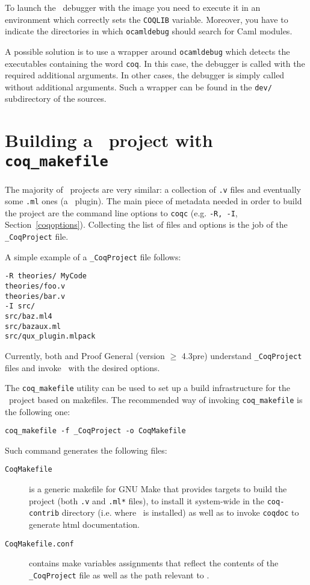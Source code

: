 To launch the \ocaml\ debugger with the image you need to execute it in
an environment which correctly sets the \texttt{COQLIB} variable.
Moreover, you have to indicate the directories in which
\texttt{ocamldebug} should search for Caml modules.

A possible solution is to use a wrapper around \texttt{ocamldebug}
which detects the executables containing the word \texttt{coq}. In
this case, the debugger is called with the required additional
arguments. In other cases, the debugger is simply called without additional
arguments. Such a wrapper can be found in the \texttt{dev/}
subdirectory of the sources.

\section[Building a \Coq\ project with {\tt coq\_makefile}]
{Building a \Coq\ project with {\tt coq\_makefile}
\label{Makefile}
}

The majority of \Coq\ projects are very similar: a collection of {\tt .v}
files and eventually some {\tt .ml} ones (a \Coq\ plugin).  The main piece
of metadata needed in order to build the project are the command 
line options to {\tt coqc} (e.g. {\tt -R, -I},
\SeeAlso Section~\ref{coqoptions}). Collecting the list of files and
options is the job of the {\tt \_CoqProject} file.

A simple example of a {\tt \_CoqProject} file follows:

\begin{verbatim}
-R theories/ MyCode
theories/foo.v
theories/bar.v
-I src/
src/baz.ml4
src/bazaux.ml
src/qux_plugin.mlpack
\end{verbatim}

Currently, both \CoqIDE{} and Proof General (version $\geq$ 4.3pre) understand
{\tt \_CoqProject} files and invoke \Coq\ with the desired options.

The {\tt coq\_makefile} utility can be used to set up a build infrastructure
for the \Coq\ project based on makefiles.  The recommended way of
invoking {\tt coq\_makefile} is the following one:

\begin{verbatim}
coq_makefile -f _CoqProject -o CoqMakefile
\end{verbatim}

Such command generates the following files:
\begin{description}
	\item[{\tt CoqMakefile}] is a generic makefile for GNU Make that provides targets to build the project (both {\tt .v} and {\tt .ml*} files), to install it system-wide in the {\tt coq-contrib} directory (i.e. where \Coq\ is installed) as well as to invoke {\tt coqdoc} to generate html documentation.

	\item[{\tt CoqMakefile.conf}] contains make variables assignments that reflect the contents of the {\tt \_CoqProject} file as well as the path relevant to \Coq{}.
\end{description}

